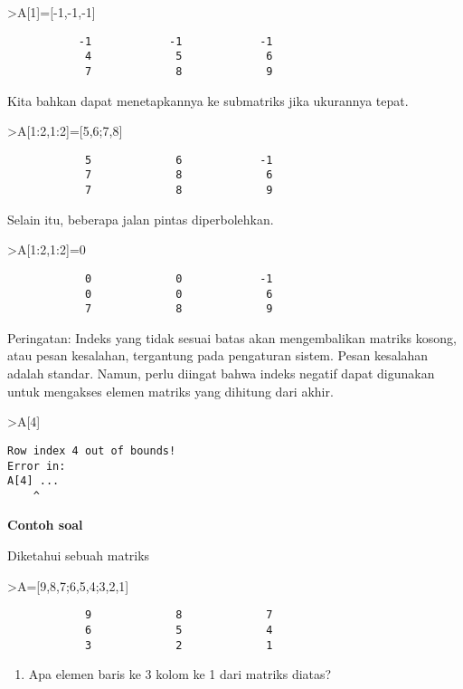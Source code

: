 \documentclass[
]{book}
\providecommand{\tightlist}{%
  \setlength{\itemsep}{0pt}\setlength{\parskip}{0pt}}
\begin{document}
\textgreater A{[}1{]}={[}-1,-1,-1{]}

\begin{verbatim}
           -1            -1            -1 
            4             5             6 
            7             8             9 
\end{verbatim}

Kita bahkan dapat menetapkannya ke submatriks jika ukurannya tepat.

\textgreater A{[}1:2,1:2{]}={[}5,6;7,8{]}

\begin{verbatim}
            5             6            -1 
            7             8             6 
            7             8             9 
\end{verbatim}

Selain itu, beberapa jalan pintas diperbolehkan.

\textgreater A{[}1:2,1:2{]}=0

\begin{verbatim}
            0             0            -1 
            0             0             6 
            7             8             9 
\end{verbatim}

Peringatan: Indeks yang tidak sesuai batas akan mengembalikan matriks kosong, atau pesan kesalahan, tergantung pada pengaturan sistem. Pesan kesalahan adalah standar. Namun, perlu diingat bahwa indeks negatif dapat digunakan untuk mengakses elemen matriks yang dihitung dari akhir.

\textgreater A{[}4{]}

\begin{verbatim}
Row index 4 out of bounds!
Error in:
A[4] ...
    ^
\end{verbatim}

\textbf{Contoh soal}

Diketahui sebuah matriks

\textgreater A={[}9,8,7;6,5,4;3,2,1{]}

\begin{verbatim}
            9             8             7 
            6             5             4 
            3             2             1 
\end{verbatim}

\begin{enumerate}
\def\labelenumi{\arabic{enumi}.}
\tightlist
\item
  Apa elemen baris ke 3 kolom ke 1 dari matriks diatas?
\end{enumerate}
\end{document}
